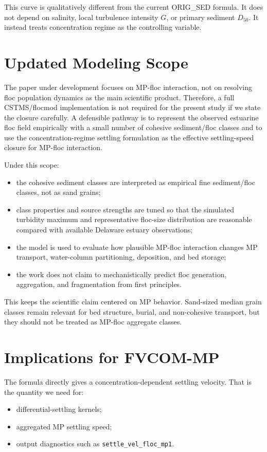 \documentclass[11pt]{article}
\begin{document}
This curve is qualitatively different from the current ORIG\_SED formula.  It
does not depend on salinity, local turbulence intensity $G$, or primary
sediment $D_{50}$.  It instead treats concentration regime as the controlling
variable.

\section*{Updated Modeling Scope}

The paper under development focuses on MP-floc interaction, not on resolving
floc population dynamics as the main scientific product.  Therefore, a full
CSTMS/flocmod implementation is not required for the present study if we state
the closure carefully.  A defensible pathway is to represent the observed
estuarine floc field empirically with a small number of cohesive sediment/floc
classes and to use the concentration-regime settling formulation as the
effective settling-speed closure for MP-floc interaction.

Under this scope:
\begin{itemize}
  \item the cohesive sediment classes are interpreted as empirical fine
        sediment/floc classes, not as sand grains;
  \item class properties and source strengths are tuned so that the simulated
        turbidity maximum and representative floc-size distribution are
        reasonable compared with available Delaware estuary observations;
  \item the model is used to evaluate how plausible MP-floc interaction changes
        MP transport, water-column partitioning, deposition, and bed storage;
  \item the work does not claim to mechanistically predict floc generation,
        aggregation, and fragmentation from first principles.
\end{itemize}

This keeps the scientific claim centered on MP behavior.  Sand-sized median
grain classes remain relevant for bed structure, burial, and non-cohesive
transport, but they should not be treated as MP-floc aggregate classes.

\section*{Implications for FVCOM-MP}

The formula directly gives a concentration-dependent settling velocity.  That
is the quantity we need for:
\begin{itemize}
  \item differential-settling kernels;
  \item aggregated MP settling speed;
  \item output diagnostics such as \texttt{settle\_vel\_floc\_mp1}.
\end{itemize}
\end{document}

